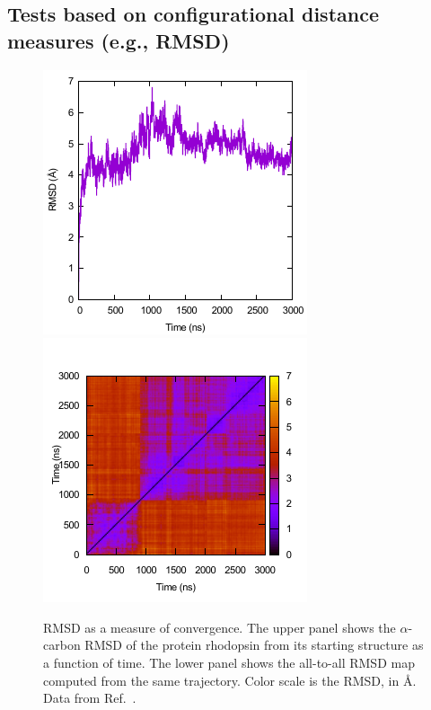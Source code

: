 \subsection{Tests based on configurational distance measures (e.g., RMSD)}
\label{sec:bio_RMSD}

\begin{figure}
  \centering
  \includegraphics[width=0.9\linewidth]{figures/rmsd}
  \includegraphics[width=0.9\linewidth]{figures/rmsds}
  \caption{RMSD as a measure of convergence.  The upper panel shows the
    $\alpha$-carbon RMSD of the protein rhodopsin from its starting structure as a
    function of time.  The lower panel shows the all-to-all RMSD map computed from the same
    trajectory.  Color scale is the RMSD, in {\AA}.  Data from Ref.\ \cite{Grossfield-2015}.}
  \label{f:rmsd}
\end{figure}


